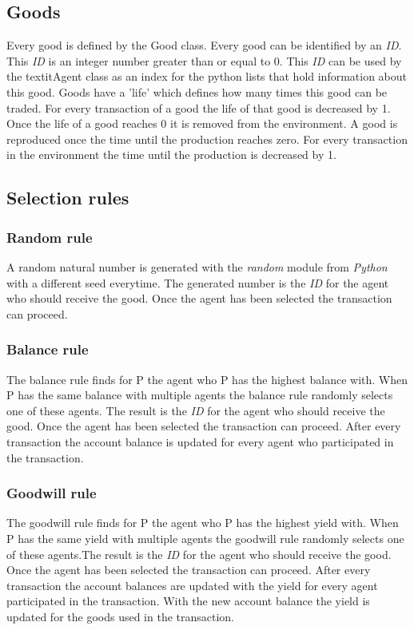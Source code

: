 \documentclass[twoside,openright]{uva-bachelor-thesis}
\begin{document}
\subsection{Goods}
Every good is defined by the Good class.  Every good can be identified by an \textit{ID}. This \textit{ID} is an integer number greater than or equal to 0. This \textit{ID} can be used by the textit{Agent} class as an index for the python lists that hold information about this good. Goods have a 'life' which defines how many times this good can be traded. For every transaction of a good the life of that good is decreased by 1. Once the life of a good reaches 0 it is removed from the environment. A good is reproduced once the time until the production reaches zero. For every transaction in the environment the time until the production is decreased by 1.

\subsection{Selection rules}

\subsubsection{Random rule}
A random natural number is generated with the \textit{random} module from \textit{Python} with a different seed everytime. The generated number is the \textit{ID} for the agent who should receive the good. Once the agent has been selected the transaction can proceed.

\subsubsection{Balance rule}
The balance rule finds for P the agent who P has the highest balance with. When P has the same balance with multiple agents the balance rule randomly selects one of these agents. The result is the \textit{ID} for the agent who should receive the good. Once the agent has been selected the transaction can proceed. After every transaction the account balance is updated for every agent who participated in the transaction.

\subsubsection{Goodwill rule}
The goodwill rule finds for P the agent who P has the highest yield with. When P has the same yield with multiple agents the goodwill rule randomly selects one of these agents.The result is the \textit{ID} for the agent who should receive the good. Once the agent has been selected the transaction can proceed. After every transaction the account balances are updated with the yield for every agent participated in the transaction. With the new account balance the yield is updated for the goods used in the transaction.
\end{document}
